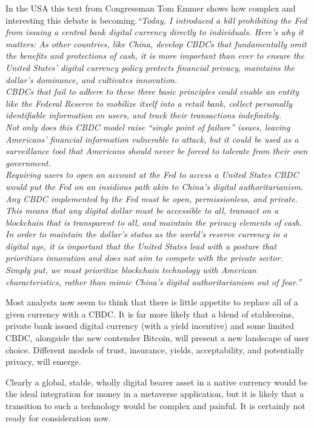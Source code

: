 In the USA this text from Congressman Tom Emmer shows how complex and interesting this debate is becoming.\textit{``Today, I introduced a bill prohibiting the Fed from issuing a central bank digital currency directly to individuals. Here’s why it matters: As other countries, like China, develop CBDCs that fundamentally omit the benefits and protections of cash, it is more important than ever to ensure the United States’ digital currency policy protects financial privacy, maintains the dollar’s dominance, and cultivates innovation.\\
CBDCs that fail to adhere to these three basic principles could enable an entity like the Federal Reserve to mobilize itself into a retail bank, collect personally identifiable information on users, and track their transactions indefinitely.\\
Not only does this CBDC model raise ``single point of failure'' issues, leaving Americans’ financial information vulnerable to attack, but it could be used as a surveillance tool that Americans should never be forced to tolerate from their own government.\\
Requiring users to open an account at the Fed to access a United States CBDC would put the Fed on an insidious path akin to China’s digital authoritarianism.\\
Any CBDC implemented by the Fed must be open, permissionless, and private. This means that any digital dollar must be accessible to all, transact on a blockchain that is transparent to all, and maintain the privacy elements of cash.\\
In order to maintain the dollar’s status as the world’s reserve currency in a digital age, it is important that the United States lead with a posture that prioritizes innovation and does not aim to compete with the private sector.\\
Simply put, we must prioritize blockchain technology with American characteristics, rather than mimic China’s digital authoritarianism out of fear.''}\par
Most analysts now seem to think that there is little appetite to replace all of a given currency with a CBDC. It is far more likely that a blend of stablecoins, private bank issued digital currency (with a yield incentive) and some limited CBDC, alongside the new contender Bitcoin, will present a new landscape of user choice. Different models of trust, insurance, yields, acceptability, and potentially privacy, will emerge. \par
Clearly a global, stable, wholly digital bearer asset in a native currency would be the ideal integration for money in a metaverse application, but it is likely that a transition to such a technology would be complex and painful. It is certainly not ready for consideration now.

